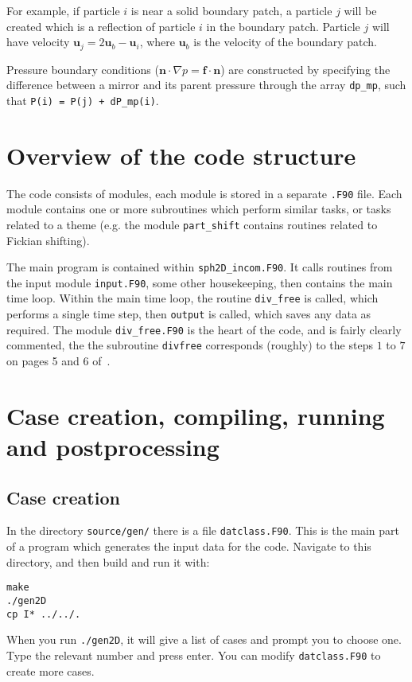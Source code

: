\documentclass[notitlepage]{revtex4-2}
\begin{document}
For example, if particle $i$ is near a solid boundary patch, a particle $j$ will be created which is a reflection of particle $i$ in the boundary patch. Particle $j$ will have velocity $\bm{u}_{j}=2\bm{u}_{b}-\bm{u}_{i}$, where $\bm{u}_{b}$ is the velocity of the boundary patch.

Pressure boundary conditions ($\bm{n}\cdot\nabla{p}=\bm{f}\cdot\bm{n}$) are constructed by specifying the difference between a mirror and its parent pressure through the array \verb|dp_mp|, such that \verb|P(i) = P(j) + dP_mp(i)|.

\section{Overview of the code structure}

The code consists of modules, each module is stored in a separate \verb|.F90| file. Each module contains one or more subroutines which perform similar tasks, or tasks related to a theme (e.g. the module \verb|part_shift| contains routines related to Fickian shifting).

The main program is contained within \verb|sph2D_incom.F90|. It calls routines from the input module \verb|input.F90|, some other housekeeping, then contains the main time loop. Within the main time loop, the routine \verb|div_free| is called, which performs a single time step, then \verb|output| is called, which saves any data as required. The module \verb|div_free.F90| is the heart of the code, and is fairly clearly commented, the the subroutine \verb|divfree| corresponds (roughly) to the steps $1$ to $7$ on pages 5 and 6 of~\cite{king_2020_ve}.

\section{Case creation, compiling, running and postprocessing}

\subsection{Case creation}\label{case}

In the directory \texttt{source/gen/} there is a file \texttt{datclass.F90}. This is the main part of a program which generates the input data for the code. Navigate to this directory, and then build and run it with:
\begin{verbatim}
make
./gen2D
cp I* ../../.
\end{verbatim}
When you run \verb|./gen2D|, it will give a list of cases and prompt you to choose one. Type the relevant number and press enter. You can modify \verb|datclass.F90| to create more cases.
\end{document}
